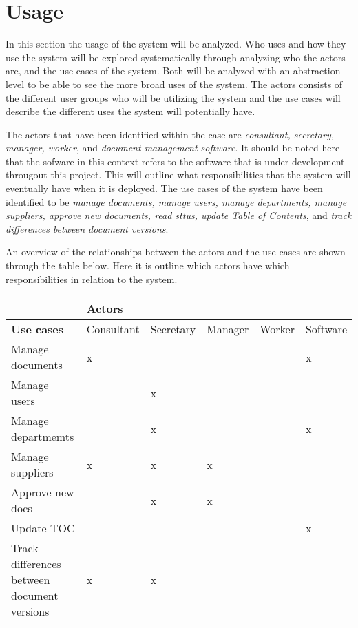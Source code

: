 \section{Usage}

In this section the usage of the system will be analyzed. Who uses and how they use the system will be explored systematically through analyzing who the actors are, and the use cases of the system.
Both will be analyzed with an abstraction level to be able to see the more broad uses of the system.
The actors consists of the different user groups who will be utilizing the system and the use cases will describe the different uses the system will potentially have.

The actors that have been identified within the case are \textit{consultant, secretary, manager, worker}, and \textit{document management software}.
It should be noted here that the sofware in this context refers to the software that is under development througout this project.
This will outline what responsibilities that the system will eventually have when it is deployed.
The use cases of the system have been identified to be \textit{manage documents, manage users, manage departments, manage suppliers, approve new documents, read sttus, update Table of Contents}, and \textit{track differences between document versions}.

An overview of the relationships between the actors and the use cases are shown through the table below. Here it is outline which actors have which responsibilities in relation to the system.

\begin{center}
\begin{tabular}{| m{10em} | m{4.5em} | m{4.5em} | m{4.5em} | m{4.5em} | m{} |}
	\hline
	& \textbf{Actors} & & & & \\
	\hline
	\textbf{Use cases} & Consultant & Secretary & Manager & Worker & Software \\
	\hline
	Manage documents & x & & & & x \\
	\hline
	Manage users & & x & & & \\
	\hline
	Manage departmemts & & x & & & x \\
	\hline
	Manage suppliers & x & x & x & &\\
	\hline
	Approve new docs & & x & x & & \\
	\hline
	Update TOC & & & & & x \\
	\hline
	Track differences between document versions & x & x & & &\\
	\hline
\end{tabular}
\end{center}

